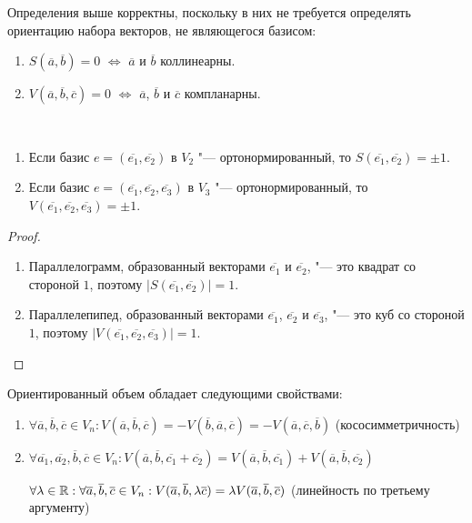 \begin{note}
	Определения выше корректны, поскольку в них не требуется определять ориентацию набора векторов, не являющегося базисом:
	\begin{enumerate}
		\item $S(\overline{a}, \overline{b}) = 0$ $\Leftrightarrow$ $\overline{a}$ и $\overline{b}$ коллинеарны.
		\item $V(\overline{a}, \overline{b}, \overline{c}) = 0$ $\Leftrightarrow$ $\overline{a}$, $\overline{b}$ и $\overline{c}$ компланарны.
	\end{enumerate}
\end{note}

\begin{proposition}~
	\begin{enumerate}
		\item Если базис $e = (\overline{e_1}, \overline{e_2})$ в $V_2$ "--- ортонормированный, то $S(\overline{e_1}, \overline{e_2}) = \pm 1$.
		\item Если базис $e = (\overline{e_1}, \overline{e_2}, \overline{e_3})$ в $V_3$ "--- ортонормированный, то $V(\overline{e_1}, \overline{e_2}, \overline{e_3}) = \pm 1$.
	\end{enumerate}
\end{proposition}

\begin{proof}~
	\begin{enumerate}
		\item Параллелограмм, образованный векторами $\overline{e_1}$ и $\overline{e_2}$, "--- это квадрат со стороной $1$, поэтому $|S(\overline{e_1}, \overline{e_2})| = 1$.
		\item Параллелепипед, образованный векторами $\overline{e_1}$, $\overline{e_2}$ и $\overline{e_3}$, "--- это куб со стороной $1$, поэтому $|V(\overline{e_1}, \overline{e_2}, \overline{e_3})| = 1$.\qedhere
	\end{enumerate}
\end{proof}

\begin{theorem}
	Ориентированный объем обладает следующими свойствами:
	\begin{enumerate}
		\item $\forall \overline{a}, \overline{b}, \overline{c} \in V_n: V(\overline{a}, \overline{b}, \overline{c}) = -V(\overline{b}, \overline{a}, \overline{c}) = -V(\overline{a}, \overline{c}, \overline{b})$ (кососимметричность)
		\item $\forall \overline{a_1}, \overline{a_2}, \overline{b}, \overline{c} \in V_n: V(\overline{a}, \overline{b}, \overline{c_1} + \overline{c_2}) = V(\overline{a}, \overline{b}, \overline{c_1}) + V(\overline{a}, \overline{b}, \overline{c_2})$
		
		$\forall \lambda \in \R: \forall \overline a, \overline b, \overline c \nolinebreak\in\nolinebreak V_n \nolinebreak: \nolinebreak V(\overline{a}, \overline{b}, \lambda\overline{c}) \hm= \lambda V(\overline{a}, \overline{b}, \overline{c})$ (линейность по третьему аргументу)
	\end{enumerate}
\end{theorem}

